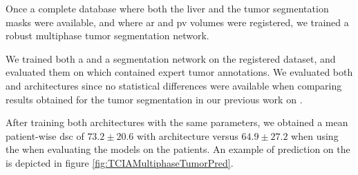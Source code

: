 Once a complete database where both the liver and the tumor segmentation
masks were available, and where \ac{ar} and \ac{pv} volumes were registered, we
trained a robust multiphase tumor segmentation network.

We trained both a  and a  segmentation network on the
registered  dataset, and evaluated them on  which
contained expert tumor annotations. We evaluated both  and 
architectures since no statistical differences were available when
comparing results obtained for the tumor segmentation in our previous
work on  \cite{Ouhmich2019}.

After training both architectures with
the same parameters, we obtained a mean patient-wise \ac{dsc} of $ 73.2 \pm 20.6 $ with 
architecture versus $ 64.9 \pm 27.2 $ when using the  when evaluating the
models on the  patients. An example of prediction on the  is
depicted in figure \ref{fig:TCIAMultiphaseTumorPred}.

